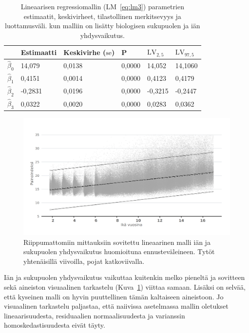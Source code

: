 \documentclass[finnish]{docopts}
\begin{document}
\begin{table}[H]
\centering
\begin{tabular}{llllll}
\toprule
  & Estimaatti & Keskivirhe ($\text{se}$) & P & $\text{LV}_{2,5}$ & $\text{LV}_{97,5}$\\
\midrule
$\hat{\beta}_0$ & 14,079 & 0,0138 & 0,0000 & 14,052 & 14,1060\\
$\hat{\beta}_1$ & 0,4151 & 0,0014 & 0,0000 & 0,4123 & 0,4179\\
$\hat{\beta}_2$ & -0,2831 & 0,0196 & 0,0000 & -0,3215 & -0,2447\\
$\hat{\beta}_3$ & 0,0322 & 0,0020 & 0,0000 & 0,0283 & 0,0362\\
\bottomrule
\end{tabular}
\caption{Lineaarisen regressiomallin (LM~\ref{eq:lm3}) parametrien estimaatit, keskivirheet, tilastollinen merkitsevyys ja luottamusväli. kun malliin on lisätty biologisen sukupuolen ja iän yhdysvaikutus.}
\label{table:lm3}
\end{table}

\begin{figure}[H]
\centering
  \includegraphics[scale=0.8]{kuvaajat/lm_baseline.png}
  \caption{Riippumattomiin mittauksiin sovitettu lineaarinen malli iän ja sukupuolen yhdysvaikutus huomioituna ennusteväleineen. Tytöt yhtenäisillä viivoilla, pojat katkoviivalla.}
  \label{fig:lm_baseline}
\end{figure}

Iän ja sukupuolen yhdysvaikutus vaikuttaa kuitenkin melko pieneltä ja sovitteen sekä aineiston visuaalinen tarkastelu (Kuva~\ref{fig:lm_baseline}) viittaa samaan. Lisäksi on selvää, että kyseinen malli on hyvin puuttellinen tämän kaltaiseen aineistoon. Jo visuaalinen tarkastelu paljastaa, että naiivissa asetelmassa mallin oletukset lineaarisuudesta, residuaalien normaalisuudesta ja varianssin homoskedastisuudesta eivät täyty.\\
\end{document}
